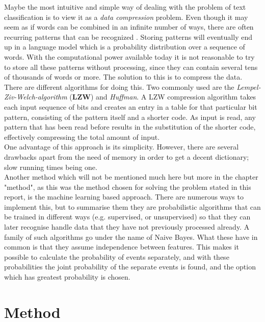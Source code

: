 \documentclass[a4paper,10pt]{article}
\begin{document}
\noindent Maybe the most intuitive and simple way of dealing with the problem of text classification is to view it as a \textit{data compression} problem. Even though it may seem as if words can be combined in an infinite number of ways, there are often recurring patterns that can be recognized \cite{AI}. Storing patterns will eventually end up in a language model \cite{ColumbiaUniversity} which is a probability distribution over a sequence of words. With the computational power available today it is not reasonable to try to store all these patterns without processing, since they can contain several tens of thousands of words or more. The solution to this is to compress the data. There are different algorithms for doing this. Two commonly used are the \textit{Lempel-Ziv-Welch-algorithm} (\textbf{LZW}) and \textit{Huffman}\cite{handouts}. A LZW compression algorithm takes each input sequence of bits and creates an entry in a table for that particular bit pattern, consisting of the pattern itself and a shorter code. As input is read, any pattern that has been read before results in the substitution of the shorter code, effectively compressing the total amount of input.\\One advantage of this approach is its simplicity. However, there are several drawbacks apart from the need of memory in order to get a decent dictionary; slow running times being one\cite{hstein}. \\

\noindent Another method which will not be mentioned much here but more in the chapter "method", as this was the method chosen for solving the problem stated in this report, is the machine learning based approach. There are numerous ways to implement this, but to summarise them they are probabilistic algorithms that can be trained in different ways (e.g. supervised, or unsupervised) so that they can later recognise handle data that they have not previously processed already. A family of such algorithms go under the name of Naive Bayes. What these have in common is that they assume independence between features. This makes it possible to calculate the probability of events separately, and with these probabilities the joint probability of the separate events is found, and the option which has greatest probability is chosen.



 


\section{Method}  
\end{document}
